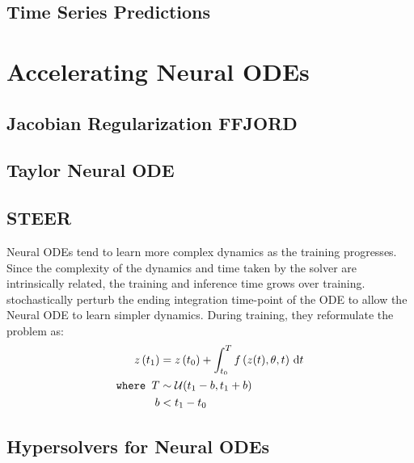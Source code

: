 \subsection{Time Series Predictions}
\label{subsec:time_series_predictions}

\section{Accelerating Neural ODEs}
\label{sec:accelerating_neural_odes_prior_works}

\subsection{Jacobian Regularization FFJORD}

\subsection{Taylor Neural ODE}

\subsection{STEER}
\label{subsec:steer}

Neural ODEs tend to learn more complex dynamics as the training progresses. Since the complexity of the dynamics and time taken by the solver are intrinsically related, the training and inference time grows over training. \citet{ghosh2020steer} stochastically perturb the ending integration time-point of the ODE to allow the Neural ODE to learn simpler dynamics. During training, they reformulate the problem as:
%
\begin{align}
  z\left(t_1\right)      & = z\left(t_0\right) + \int_{t_0}^{T} f\left(z(t), \theta, t\right) \, \mathrm{d}t \\
  \texttt{where } T  & \sim \mathcal{U}(t_1 - b, t_1 + b)                                \\
  \phantom{where } b & < t_1 - t_0
\end{align}
%


\subsection{Hypersolvers for Neural ODEs}
